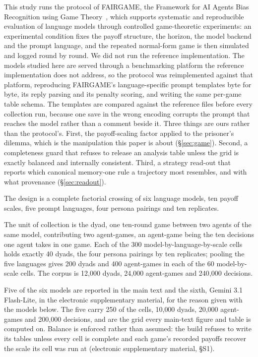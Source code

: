 \documentclass[11pt,a4paper]{article}
\begin{document}
This study runs the protocol of FAIRGAME, the Framework for AI Agents Bias
Recognition using Game Theory~\citep{fairgame2025}, which supports systematic and
reproducible evaluation of language models through controlled game-theoretic
experiments: an experimental condition fixes the payoff structure, the horizon,
the model backend and the prompt language, and the repeated normal-form game is
then simulated and logged round by round. We did not run the reference
implementation. The models studied here are served through a benchmarking
platform the reference implementation does not address, so the protocol was
reimplemented against that platform, reproducing FAIRGAME's language-specific
prompt templates byte for byte, its reply parsing and its penalty scoring, and
writing the same per-game table schema. The templates are compared against the
reference files before every collection run, because one save in the wrong
encoding corrupts the prompt that reaches the model rather than a comment beside
it. Three things are ours rather than the protocol's. First, the payoff-scaling
factor applied to the prisoner's dilemma, which is the manipulation this paper is
about (\S\ref{sec:game}). Second, a completeness guard that refuses to release an
analysis table unless the grid is exactly balanced and internally consistent.
Third, a strategy read-out that reports which canonical memory-one rule a
trajectory most resembles, and with what provenance (\S\ref{sec:readout}).

The design is a complete factorial crossing of six language models, ten payoff
scales, five prompt languages, four persona pairings and ten replicates.

The unit of collection is the dyad, one ten-round game between two agents of the
same model, contributing two agent-games, an agent-game being the ten decisions
one agent takes in one game. Each of the 300
model-by-language-by-scale cells holds exactly 40 dyads, the four persona
pairings by ten replicates; pooling the five languages gives 200 dyads and 400
agent-games in each of the 60 model-by-scale cells. The corpus is 12{,}000
dyads, 24{,}000 agent-games and 240{,}000 decisions.

Five of the six models are reported in the main text and the sixth, Gemini 3.1
Flash-Lite, in the electronic supplementary material, for the reason given with
the models below. The five carry 250 of the cells, 10{,}000 dyads, 20{,}000
agent-games and 200{,}000 decisions, and are the grid every main-text figure and
table is computed on. Balance is enforced rather than assumed: the build refuses
to write its tables unless every cell is complete and each game's recorded
payoffs recover the scale its cell was run at (electronic supplementary
material, \S S1).
\end{document}

